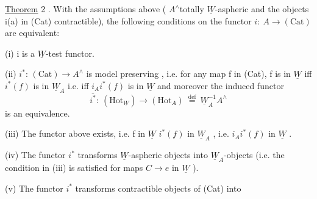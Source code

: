 \uline{Theorem} 2 . With the assumptions above ( $A^\wedge$\hand{/}totally $\underline{W}$-aspheric and the
objects i(a) in (Cat) contractible), the following conditions on the
functor $i:\ A\to(\mathrm{Cat})$ are equivalent:

(i) i is a $\underline{W}$-test functor.

(ii) $i^*$: $(\mathrm{Cat})\to A^\wedge$ is model preserving , i.e.
for any map f in (Cat), f is in $\underline{W}$ iff $i^*(f)$ is in $\underline{W}_A$ \hand{(}i.e. iff $i_Ai^*(f)$
is in $\underline{W}$ \hand{)}\hand{,} and moreover the induced functor
\[ \overline{i^*} :\ (\mathrm{Hot}_{\underline{W}})\longrightarrow(\mathrm{Hot}_A) \ \overset{\mathrm{def}}{=}\ \underline{W}_A^{-1}A^\wedge \]
is an equivalence.

(iii) The functor above exists, i.e.  f  in $\underline{W}$ \hand{,} $i^*(f)$ in $\underline{W}_A$ ,
i.e. $i_Ai^*(f)$ in $\underline{W}$ .

(iv) The functor $i^*$ transforms $\underline{W}$-aspheric objects into $\underline{W}_A$-objects
(i.e. the condition in (iii) is satisfied for maps $C\to e$ in $\underline{W}$ ).

(v) The functor $i^*$ transforms contractible objects of (Cat) into

